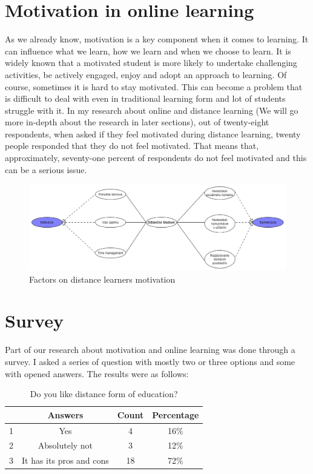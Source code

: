 \documentclass[10pt,twoside,english,a4paper]{article}
\begin{document}
\section{Motivation in online learning}
As we already know, motivation is a key component when it comes to learning. It can influence what we learn, how we learn and when we choose to learn.\cite{Schunk} It is widely known that a motivated student is more likely to undertake challenging activities, be actively engaged, enjoy and adopt an approach to learning.
Of course, sometimes it is hard to stay motivated. This can become a problem that is difficult to deal with even in traditional learning form and lot of students struggle with it. In my research about online and distance learning (We will go more in-depth about the research in later sections), out of twenty-eight respondents, when asked if they feel motivated during distance learning, twenty people responded that they do not feel motivated. That means that, approximately, seventy-one percent of respondents do not feel motivated and this can be a serious issue.
\begin{figure}[h]
\centering
\includegraphics[width=\textwidth]{Picture1.png}
\caption{Factors on distance learners motivation}
\end{figure}

\section{Survey}
Part of our research about motivation and online learning was done through a survey. I asked a series of question with mostly two or three options and some with opened answers. The results were as follows:
\begin{table}[h!]
\caption{Do you like distance form of education?}
\centering
 \begin{tabular}{||c|c|c|c||}
 \hline
  & Answers & Count & Percentage \\ [0.5ex] 
 \hline\hline
 1 & Yes & 4 & 16\% \\ 
 \hline
 2 & Absolutely not & 3 & 12\% \\
 \hline
 3 & It has its pros and cons & 18 & 72\% \\
 \hline
\end{tabular}
\end{table}
\end{document}
